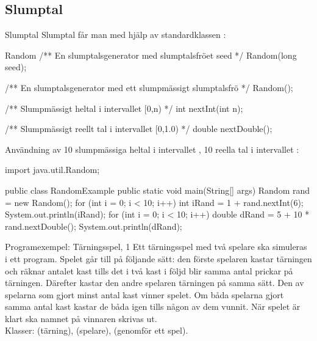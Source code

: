 \documentclass{lecturenotes}
\begin{document}

\subsection{Slumptal}
\begin{Slide}
{Slumptal}
Slumptal får man med hjälp av standardklassen :

\begin{ClassSpec}{Random}
/** En slumptalsgenerator med slumptalsfröet seed */
Random(long seed);

/** En slumptalsgenerator med ett slumpmässigt 
    slumptalsfrö */
Random();

/** Slumpmässigt heltal i intervallet [0,n) */
int nextInt(int n);

/** Slumpmässigt reellt tal i intervallet [0,1.0) */
double nextDouble();
\end{ClassSpec}
\end{Slide} 

\begin{Slide}
{Användning av }
10 slumpmässiga heltal i intervallet \code{[1, 6]}, 10 reella tal i intervallet \code{[5.0,~15.0)}:

\begin{Code}
import java.util.Random;

public class RandomExample {
    public static void main(String[] args) {
        Random rand = new Random();
        for (int i = 0; i < 10; i++) {
            int iRand = 1 + rand.nextInt(6);
            System.out.println(iRand);
        }
        for (int i = 0; i < 10; i++) {
            double dRand = 5 + 10 * rand.nextDouble();
            System.out.println(dRand);
        }
    }
}
\end{Code}
\end{Slide} 

\begin{Slide}
{Programexempel: Tärningsspel, 1}
Ett tärningsspel med två spelare ska simuleras i ett program. Spelet går till på följande sätt: den förste spelaren kastar tärningen och räknar antalet kast tills det i två kast i följd blir samma antal prickar på tärningen. Därefter kastar den andre spelaren tärningen på samma sätt. Den av spelarna som gjort minst antal kast vinner spelet. Om båda spelarna gjort samma antal kast kastar de båda igen tills någon av dem vunnit. När spelet är klart ska namnet på vinnaren skrivas ut.\\

Klasser:  (tärning),  (spelare),  (genomför ett spel).
\end{Slide} 
\end{document}
